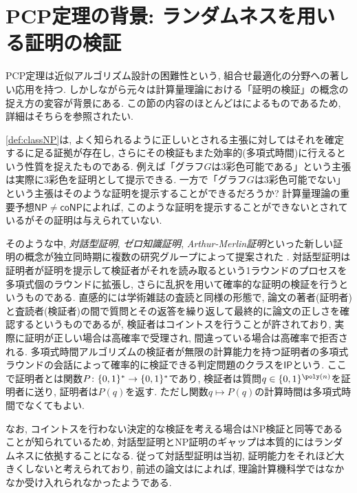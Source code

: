 \section{PCP定理の背景: ランダムネスを用いる証明の検証} \label{sec:background-of-PCP}
PCP定理は近似アルゴリズム設計の困難性という, 組合せ最適化の分野への著しい応用を持つ. しかしながら元々は計算量理論における「証明の検証」の概念の捉え方の変容が背景にある.
この節の内容のほとんどは\cite{history-of-PCP}によるものであるため,
詳細はそちらを参照されたい.

\cref{def:classNP}は, よく知られるように正しいとされる主張に対してはそれを確定するに足る証拠が存在し, さらにその検証もまた効率的(多項式時間)に行えるという性質を捉えたものである.
例えば「グラフ$G$は3彩色可能である」という主張は実際に3彩色を証明として提示できる.
一方で「グラフ$G$は3彩色可能でない」という主張はそのような証明を提示することができるだろうか?
計算量理論の重要予想$\mathsf{NP}\ne\mathsf{coNP}$によれば, このような証明を提示することができないとされているがその証明は与えられていない.

そのような中, \emph{対話型証明}, \emph{ゼロ知識証明}, \emph{Arthur-Merlin証明}といった新しい証明の概念が独立同時期に複数の研究グループによって提案された \citet{GMR85,Babai1985}.
対話型証明は証明者が証明を提示して検証者がそれを読み取るという1ラウンドのプロセスを多項式個のラウンドに拡張し, さらに乱択を用いて確率的な証明の検証を行うというものである.
直感的には学術雑誌の査読と同様の形態で, 論文の著者(証明者)と査読者(検証者)の間で質問とその返答を繰り返して最終的に論文の正しさを確認するというものであるが, 検証者はコイントスを行うことが許されており, 実際に証明が正しい場合は高確率で受理され, 間違っている場合は高確率で拒否される.
多項式時間アルゴリズムの検証者が無限の計算能力を持つ証明者の多項式ラウンドの会話によって確率的に検証できる判定問題のクラスを$\mathsf{IP}$という.
ここで証明者とは関数$P\colon \{0,1\}^*\to\{0,1\}^*$であり, 検証者は質問$q\in\binset^{\poly(n)}$を証明者に送り, 証明者は$P(q)$を返す.
ただし関数$q\mapsto P(q)$の計算時間は多項式時間でなくてもよい.

なお, コイントスを行わない決定的な検証を考える場合はNP検証と同等であることが知られているため, 対話型証明とNP証明のギャップは本質的にはランダムネスに依拠することになる. 従って対話型証明は当初, 証明能力をそれほど大きくしないと考えられており, 前述の論文は\cite{history-of-PCP}によれば, 理論計算機科学ではなかなか受け入れられなかったようである.

